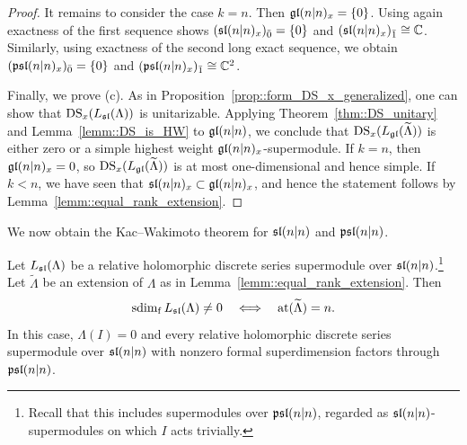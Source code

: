 \begin{proof}
It remains to consider the case $k=n$. Then $\gl(n\vert n)_x=\{0\}$. Using again exactness of the first sequence shows $(\sl(n\vert n)_x)_{\bar{0}}=\{0\}$ and $(\sl(n\vert n)_x)_{\bar{1}}\cong \CC$. Similarly, using exactness of the second long exact sequence, we obtain $(\psl(n\vert n)_x)_{\bar{0}}=\{0\}$ and $(\psl(n\vert n)_x)_{\bar{1}}\cong \CC^{2}$.   


Finally, we prove (c). As in 
Proposition~\ref{prop::form_DS_x_generalized}, one can show that $\DS_{x}(L_{\sl}(\Lambda))$ is unitarizable. Applying Theorem~\ref{thm::DS_unitary} and
Lemma~\ref{lemm::DS_is_HW} to $\gl(n\vert n)$, we conclude that $\DS_x(L_{\gl}(\widetilde\Lambda))$ is either zero or a
simple highest weight $\gl(n\vert n)_x$-supermodule. If $k=n$, then $\gl(n\vert n)_x=0$, so $\DS_x(L_{\gl}(\widetilde\Lambda))$ is at most
one-dimensional and hence simple. If $k<n$, we have seen that $\sl(n\vert n)_{x}\subset \gl(n\vert n)_{x}$, and hence the statement follows by Lemma~\ref{lemm::equal_rank_extension}.
\end{proof}

We now obtain the Kac--Wakimoto theorem for $\sl(n\vert n)$ and $\psl(n\vert n)$.

\begin{theorem}\label{thm::equal_rank_formal_KW}
Let $L_{\sl}(\Lambda)$ be a relative holomorphic discrete series
supermodule over $\sl(n\vert n)$.\footnote{Recall that this includes supermodules over
$\psl(n\vert n)$, regarded as $\sl(n\vert n)$-supermodules on which $I$
acts trivially.} Let $\widetilde\Lambda$ be an extension of $\Lambda$ as
in Lemma~\ref{lemm::equal_rank_extension}. Then
\[
\fsdim L_{\sl}(\Lambda)\neq0
\quad\Longleftrightarrow\quad
\at(\widetilde\Lambda)=n.
\]
In this case, $\Lambda(I)=0$ and every relative holomorphic discrete
series supermodule over $\sl(n\vert n)$ with nonzero formal superdimension
factors through $\psl(n\vert n)$.
\end{theorem}

